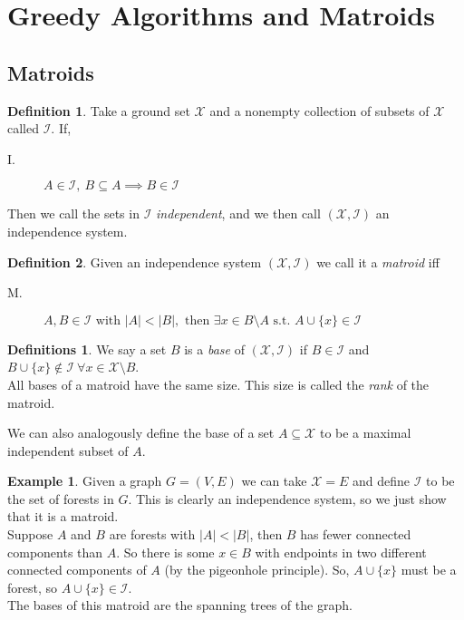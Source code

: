 \documentclass{article}
\theoremstyle{definition}
\newtheorem*{defn}{Definition}
\newtheorem*{defns}{Definitions}
\newtheorem*{ex}{Example}
\newcommand{\X}{\mathcal{X}}
\newcommand{\I}{\mathcal{I}}
\begin{document}
\section{Greedy Algorithms and Matroids} %

\subsection{Matroids}

\begin{defn}
Take a ground set $\X$ and a nonempty collection of subsets of $\X$ called $\I$.
If,
\begin{description}
	\item[I.] $A\in \I,\ B\subseteq A \implies B\in \I$
\end{description}
Then we call the sets in $\I$ \emph{independent}, and we then call $(\X,\I)$ an independence system.
\end{defn}

\begin{defn}
Given an independence system $(\X,\I)$ we call it a \emph{matroid} iff
\begin{description}
	\item[M.] $A,B\in \I \text{ with } |A|<|B|, \text{ then } \exists x\in B\setminus A \text{ s.t. } A\cup \{x\} \in \I$
\end{description}
\end{defn}

\begin{defns}
We say a set $B$ is a \emph{base} of $(\X,\I)$ if $B\in \I$ and $B\cup \{x\}\not\in\I\ \forall x\in\X\setminus B$.\\
All bases of a matroid have the same size.
This size is called the \emph{rank} of the matroid.
\end{defns}

We can also analogously define the base of a set $A\subseteq \X$ to be a maximal independent subset of $A$.

\begin{ex}
Given a graph $G = (V,E)$ we can take $\X = E$ and define $\I$ to be the set of forests in $G$.
This is clearly an independence system, so we just show that it is a matroid. \\
Suppose $A$ and $B$ are forests with $|A|<|B|$, then $B$ has fewer connected components than $A$.
So there is some $x\in B$ with endpoints in two different connected components of $A$ (by the pigeonhole principle).
So, $A\cup\{x\}$ must be a forest, so $A\cup\{x\} \in \I$. \\
The bases of this matroid are the spanning trees of the graph.
\end{ex}
\end{document}
